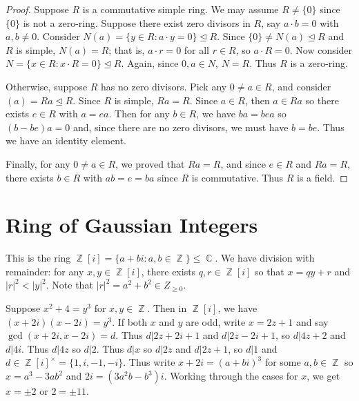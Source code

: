 \documentclass[12pt, a4paper]{book}
\DeclareMathOperator{\Z}{\mathbb{Z}}
\DeclareMathOperator{\C}{\mathbb{C}}
\theoremstyle{nonumberplain}
\newtheorem{proof}{Proof}
\begin{document}
\begin{proof}
    Suppose $R$ is a commutative simple ring.
    We may assume $R\neq\{0\}$ since $\{0\}$ is not a zero-ring.
    Suppose there exist zero divisors in $R$, say $a\cdot b=0$ with $a,b\neq 0$.
    Consider $N(a)=\{y\in R:a\cdot y=0\}\trianglelefteq R$.
    Since $\{0\}\neq N(a)\trianglelefteq R$ and $R$ is simple, $N(a)=R$; that is, $a\cdot r=0$ for all $r\in R$, so $a\cdot R=0$.
    Now consider $N=\{x\in R:x\cdot R=0\}\trianglelefteq R$.
    Again, since $0,a\in N$, $N=R$.
    Thus $R$ is a zero-ring.

    Otherwise, suppose $R$ has no zero divisors.
    Pick any $0\neq a\in R$, and consider $(a)=Ra\trianglelefteq R$.
    Since $R$ is simple, $Ra=R$.
    Since $a\in R$, then $a\in Ra$ so there exists $e\in R$ with $a=ea$.
    Then for any $b\in R$, we have $ba=bea$ so $(b-be)a=0$ and, since there are no zero divisors, we must have $b=be$.
    Thus we have an identity element.

    Finally, for any $0\neq a\in R$, we proved that $Ra=R$, and since $e\in R$ and $Ra=R$, there exists $b\in R$ with $ab=e=ba$ since $R$ is commutative.
    Thus $R$ is a field.
\end{proof}
\section{Ring of Gaussian Integers}
This is the ring $\Z[i]=\{a+bi:a,b\in\Z\}\leq\C$.
We have division with remainder: for any $x,y\in\Z[i]$, there exists $q,r\in\Z[i]$ so that $x=qy+r$ and $|r|^2<|y|^2$.
Note that $|r|^2=a^2+b^2\in Z_{\geq 0}$.

Suppose $x^2+4=y^3$ for $x,y\in\Z$.
Then in $\Z[i]$, we have $(x+2i)(x-2i)=y^3$.
If both $x$ and $y$ are odd, write $x=2z+1$ and say $\gcd(x+2i,x-2i)=d$.
Thus $d|2z+2i+1$ and $d|2z-2i+1$, so $d|4z+2$ and $d|4i$.
Thus $d|4z$ so $d|2$.
Thus $d|x$ so $d|2z$ and $d|2z+1$, so $d|1$ and $d\in\Z[i]^\times=\{1,i,-1,-i\}$.
Thus write $x+2i=(a+bi)^3$ for some $a,b\in\Z$ so $x=a^3-3ab^2$ and $2i=(3a^2b-b^3)i$.
Working through the cases for $x$, we get $x=\pm 2$ or $2=\pm 11$.
\end{document}
